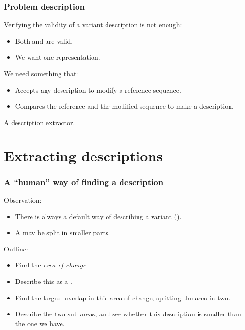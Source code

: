 \documentclass[slidestop]{beamer}
\begin{document}
\begin{frame}
  \frametitle{Problem description}

  Verifying the validity of a variant description is not enough:
  \begin{itemize}
    \item Both  and \bt{[5G>A;7C>A]} are valid.
    \item We want one representation.
  \end{itemize}
  \bigskip
  \pause

  We need something that:
  \begin{itemize}
    \item Accepts any description to modify a reference sequence.
    \item Compares the reference and the modified sequence to make a
      description.
  \end{itemize}
  \bigskip
  \pause

  A description extractor.
\end{frame}

\section{Extracting descriptions}
\begin{frame}
  \frametitle{A ``human'' way of finding a description}

  Observation:
  \begin{itemize}
    \item There is always a default way of describing a variant ().
    \item A  may be split in smaller parts.
  \end{itemize}
  \bigskip
  \pause

  Outline:
  \begin{itemize}
    \item Find the \emph{area of change}.
    \item Describe this as a .
    \item Find the largest overlap in this area of change, splitting the area
      in two.
    \item Describe the two sub areas, and see whether this description is
      smaller than the one we have.
  \end{itemize}
\end{frame}
\end{document}
